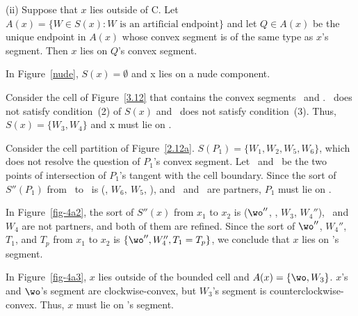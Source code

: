 \begin{theorem}

(ii) Suppose that $x$ lies outside of C.
Let $A(x) = \{ W \in S(x) : W \mbox{ is an artificial endpoint}\}$ and
let $Q \in A(x)$ be the unique endpoint in $A(x)$ whose convex segment is of the
same type as $x$'s segment.
Then $x$ lies on $Q$'s convex segment.
%
\end{theorem}
%
%
\begin{example}
In Figure~\ref{nude}, $S(x) = \emptyset$ and x lies on a nude component.

Consider the cell of Figure~\ref{3.12} that contains the convex segments 
\wwa\ and .
\wo\ does not satisfy condition~(2) of $S(x)$ and \wt\ does not satisfy condition~(3).
Thus, $S(x) = \{W_{3},W_{4}\}$ and x must lie on .

Consider the cell partition of Figure~\ref{2.12a}.
$S(P_{1}) = \{W_{1},W_{2},W_{5},W_{6}\}$, which does not resolve the question
of $P_{1}$'s convex segment.
Let \xo\ and \xt\ be the two points of intersection of $P_{1}$'s tangent
with the cell boundary.
Since the sort of $S''(P_{1})$ from \xo\ to \xt\ is (\wo, $W_{6},\ W_{5}$, \wt),
and \wo\ and \wt\ are partners, $P_{1}$ must lie on \wwa.

In Figure~\ref{fig-4a2}, the sort of $S''(x)$ from $x_{1}$ to $x_{2}$ is ($\wo''$,
\wt, $W_{3}$, $W_{4}''$), \wo\ and $W_{4}$ are not partners,
and both of them are refined. 
Since the sort of $\wo''$, $W_{4}''$, $T_{1}$, and $T_{p}$ from $x_{1}$ to
$x_{2}$ is $\{\wo'',W_{4}'',T_{1} = T_{p}\}$, we conclude that $x$ lies on \wo's segment.

In Figure~\ref{fig-4a3}, $x$ lies outside of the bounded cell and
$A(x) = \{\wo,W_{3}\}$.
$x$'s and $\wo$'s segment are
clockwise-convex, but $W_{3}$'s segment is counterclockwise-convex.
Thus, $x$ must lie on \wo's segment.
\end{example}
